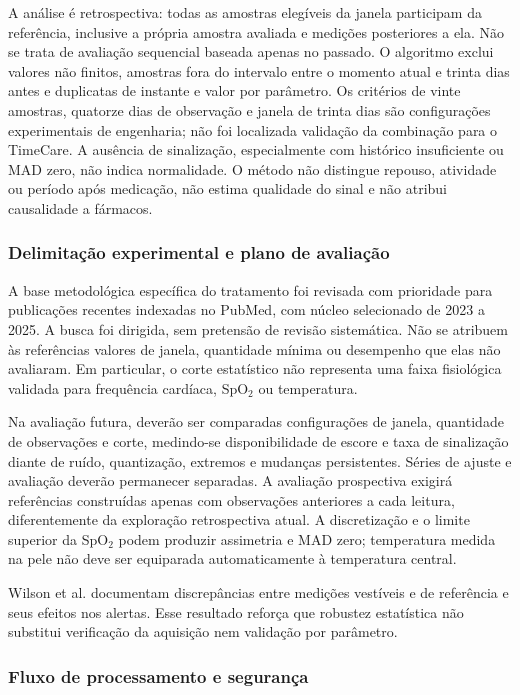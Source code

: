 \documentclass[12pt]{article}
\begin{document}
A análise é retrospectiva: todas as amostras elegíveis da janela participam da referência, inclusive a própria amostra avaliada e medições posteriores a ela. Não se trata de avaliação sequencial baseada apenas no passado. O algoritmo exclui valores não finitos, amostras fora do intervalo entre o momento atual e trinta dias antes e duplicatas de instante e valor por parâmetro. Os critérios de vinte amostras, quatorze dias de observação e janela de trinta dias são configurações experimentais de engenharia; não foi localizada validação da combinação para o TimeCare. A ausência de sinalização, especialmente com histórico insuficiente ou MAD zero, não indica normalidade. O método não distingue repouso, atividade ou período após medicação, não estima qualidade do sinal e não atribui causalidade a fármacos.

\subsubsection{Delimitação experimental e plano de avaliação}

A base metodológica específica do tratamento foi revisada com prioridade para publicações recentes indexadas no PubMed, com núcleo selecionado de 2023 a 2025. A busca foi dirigida, sem pretensão de revisão sistemática. Não se atribuem às referências valores de janela, quantidade mínima ou desempenho que elas não avaliaram. Em particular, o corte estatístico não representa uma faixa fisiológica validada para frequência cardíaca, SpO$_2$ ou temperatura.

Na avaliação futura, deverão ser comparadas configurações de janela, quantidade de observações e corte, medindo-se disponibilidade de escore e taxa de sinalização diante de ruído, quantização, extremos e mudanças persistentes. Séries de ajuste e avaliação deverão permanecer separadas. A avaliação prospectiva exigirá referências construídas apenas com observações anteriores a cada leitura, diferentemente da exploração retrospectiva atual. A discretização e o limite superior da SpO$_2$ podem produzir assimetria e MAD zero; temperatura medida na pele não deve ser equiparada automaticamente à temperatura central.

Wilson et al. \cite{wilson2025completeness} documentam discrepâncias entre medições vestíveis e de referência e seus efeitos nos alertas. Esse resultado reforça que robustez estatística não substitui verificação da aquisição nem validação por parâmetro.

\subsubsection{Fluxo de processamento e segurança}
\end{document}

